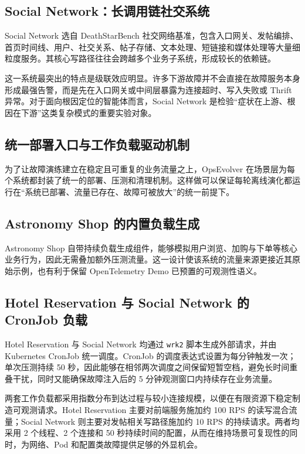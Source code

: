\subsection{Social Network：长调用链社交系统}

Social Network 选自 DeathStarBench 社交网络基准，包含入口网关、发帖编排、首页时间线、用户、社交关系、帖子存储、文本处理、短链接和媒体处理等大量细粒度服务。其核心写路径往往会跨越多个业务子系统，形成较长的依赖链。

这一系统最突出的特点是级联效应明显。许多下游故障并不会直接在故障服务本身形成最强告警，而是先在入口网关或中间层暴露为连接超时、写入失败或 Thrift 异常。对于面向根因定位的智能体而言，Social Network 是检验“症状在上游、根因在下游”这类复杂模式的重要实验对象。

\subsection{统一部署入口与工作负载驱动机制}

为了让故障演练建立在稳定且可重复的业务流量之上，OpsEvolver 在场景层为每个系统都封装了统一的部署、压测和清理机制。这样做可以保证每轮离线演化都运行在“系统已部署、流量已存在、故障可被放大”的统一前提下。

\subsection{Astronomy Shop 的内置负载生成}

Astronomy Shop 自带持续负载生成组件，能够模拟用户浏览、加购与下单等核心业务行为，因此无需叠加额外压测流量。这一设计使该系统的流量来源更接近其原始示例，也有利于保留 OpenTelemetry Demo 已预置的可观测性语义。

\subsection{Hotel Reservation 与 Social Network 的 CronJob 负载}

Hotel Reservation 与 Social Network 均通过 \texttt{wrk2}\cite{wrk2} 脚本生成外部请求，并由 Kubernetes CronJob 统一调度。CronJob 的调度表达式设置为每分钟触发一次；单次压测持续 50 秒，因此能够在相邻两次调度之间保留短暂空档，避免长时间重叠干扰，同时又能确保故障注入后的 5 分钟观测窗口内持续存在业务流量。

两套工作负载都采用指数分布到达过程与较小连接规模，以便在有限资源下稳定制造可观测请求。Hotel Reservation 主要对前端服务施加约 100 RPS 的读写混合流量；Social Network 则主要对发帖相关写路径施加约 10 RPS 的持续请求。两者均采用 2 个线程、2 个连接和 50 秒持续时间的配置，从而在维持场景可复现性的同时，为网络、Pod 和配置类故障提供足够的外显机会。

